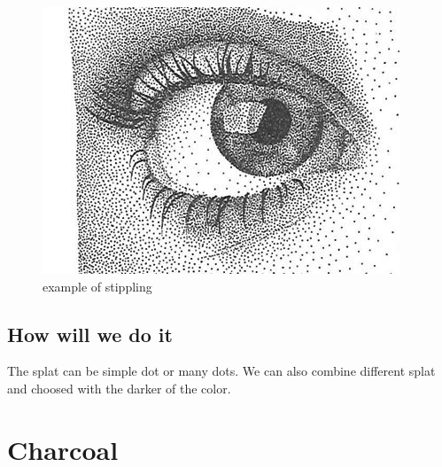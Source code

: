 \documentclass[12pt]{article}
\begin{document}
\begin{figure}[!ht]
    \begin{center}
        \includegraphics[scale=0.5]{image/stippling.jpg}
        \caption{example of stippling}
    \end{center}
\end{figure}

\subsection*{How will we do it}

The splat can be simple dot or many dots. We can also combine different splat and choosed with the darker of the color.

\section{Charcoal}
\end{document}
